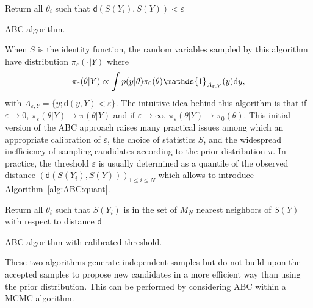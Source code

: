 \documentclass[english,graybox,envcountchap,envcountsame,sectrefs,shortlabels]{svmono}
\theoremstyle{style}
\newcommand{\eqsp}{}
\begin{document}
\begin{algorithm}[H] \label{alg:ABC}
Return all $\theta_i$ such that $\mathsf{d}(S(Y_i),S(Y))<\varepsilon$\;
\caption{ABC algorithm.}
\end{algorithm}

\medskip

When $S$ is the identity function, the random variables sampled by this  algorithm have distribution $\pi_{\varepsilon}(\cdot |Y)$ where
$$
\pi_{\varepsilon}(\theta|Y)\propto \int p(y|\theta)\pi_0(\theta) \mathds{1}_{A_{\varepsilon,Y}}(y)\rmd y\eqsp,
$$
with $A_{\varepsilon,Y} = \{y\eqsp;\mathsf{d}(y,Y)<\varepsilon\eqsp\}$. The intuitive idea behind this algorithm is that if  $\varepsilon \to 0$, $\pi_{\varepsilon}(\theta|Y) \to \pi(\theta|Y)$ and if $\varepsilon \to \infty$, $\pi_{\varepsilon}(\theta|Y) \to \pi_0(\theta)$. This initial version of the ABC approach raises many practical  issues among which an appropriate calibration of $\varepsilon$, the choice of statistics $S$, and the widespread inefficiency of sampling candidates according to the prior distribution $\pi$. In practice, the threshold $\varepsilon$ is usually determined as a quantile of the observed distance $(\mathsf{d}(S(Y_i),S(Y)))_{1\leqslant i \leqslant N}$ which allows to introduce Algorithm~\ref{alg:ABC:quant}.

\medskip

\begin{algorithm}[H] \label{alg:ABC:quant}
Return all $\theta_i$ such that $S(Y_i)$ is in the set of $M_N$ nearest neighbors of $S(Y)$ with respect to distance $\mathsf{d}$\;
\caption{ABC algorithm with calibrated threshold.}
\end{algorithm}

\medskip

These two algorithms generate independent samples but do not build upon the accepted samples to propose new candidates in a more efficient way than using the prior distribution. This can be performed by considering  ABC within a MCMC algorithm. %

%
%

\end{document}
